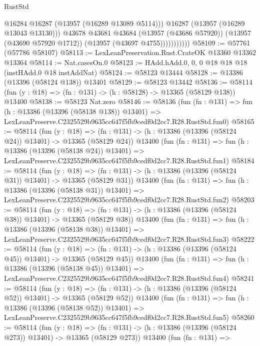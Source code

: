 \begin{lexlean}{RustStd}
\begin{coremodule}
                          @16284
                          @16287
                          (@13957 (@16289 @13089 @5114)))
                        @16287
                        (@13957 (@16289 @13043 @13130)))
                      @43678
                      @43681
                      @43684
                      (@13957 (@43686 @57920))
                      (@13957 (@43690 @57920 @1712))
                      (@13957 (@43697 @4755)))))))))))
@58109 := @57761 (@57786 @58107)
@58113 := LexLeanPreservation.Rust.CrateOK @13360 @13362 @13364
@58114 := Nat.casesOn.{0}
@58123 := HAdd.hAdd.{0, 0, 0} @18 @18 @18 (instHAdd.{0} @18 instAddNat)
@58124 := @58123 @13444
@58128 := @13386 (@13396 (@58124 @138)) @13401
@58129 := @58123 @13442
@58136 := @58114 (fun (y : @18) => (fn : @131) -> (h : @58128) -> @13365 (@58129 @138)) @13400
@58138 := @58123 Nat.zero
@58146 := @58136
    (fun (fn : @131) =>
    fun (h : @13386 (@13396 (@58138 @138)) @13401) =>
    LexLeanPreserve.C2325529b9635cc647f5fb9cedf0d2cc7.R28.RustStd.fun0)
@58165 := @58114
    (fun (y : @18) =>
    (fn : @131) -> (h : @13386 (@13396 (@58124 @24)) @13401) -> @13365 (@58129 @24))
    @13400
    (fun (fn : @131) =>
    fun (h : @13386 (@13396 (@58138 @24)) @13401) =>
    LexLeanPreserve.C2325529b9635cc647f5fb9cedf0d2cc7.R28.RustStd.fun1)
@58184 := @58114
    (fun (y : @18) =>
    (fn : @131) -> (h : @13386 (@13396 (@58124 @31)) @13401) -> @13365 (@58129 @31))
    @13400
    (fun (fn : @131) =>
    fun (h : @13386 (@13396 (@58138 @31)) @13401) =>
    LexLeanPreserve.C2325529b9635cc647f5fb9cedf0d2cc7.R28.RustStd.fun2)
@58203 := @58114
    (fun (y : @18) =>
    (fn : @131) -> (h : @13386 (@13396 (@58124 @38)) @13401) -> @13365 (@58129 @38))
    @13400
    (fun (fn : @131) =>
    fun (h : @13386 (@13396 (@58138 @38)) @13401) =>
    LexLeanPreserve.C2325529b9635cc647f5fb9cedf0d2cc7.R28.RustStd.fun3)
@58222 := @58114
    (fun (y : @18) =>
    (fn : @131) -> (h : @13386 (@13396 (@58124 @45)) @13401) -> @13365 (@58129 @45))
    @13400
    (fun (fn : @131) =>
    fun (h : @13386 (@13396 (@58138 @45)) @13401) =>
    LexLeanPreserve.C2325529b9635cc647f5fb9cedf0d2cc7.R28.RustStd.fun4)
@58241 := @58114
    (fun (y : @18) =>
    (fn : @131) -> (h : @13386 (@13396 (@58124 @52)) @13401) -> @13365 (@58129 @52))
    @13400
    (fun (fn : @131) =>
    fun (h : @13386 (@13396 (@58138 @52)) @13401) =>
    LexLeanPreserve.C2325529b9635cc647f5fb9cedf0d2cc7.R28.RustStd.fun5)
@58260 := @58114
    (fun (y : @18) =>
    (fn : @131) -> (h : @13386 (@13396 (@58124 @273)) @13401) -> @13365 (@58129 @273))
    @13400
    (fun (fn : @131) =>

\end{coremodule}
\end{lexlean}
